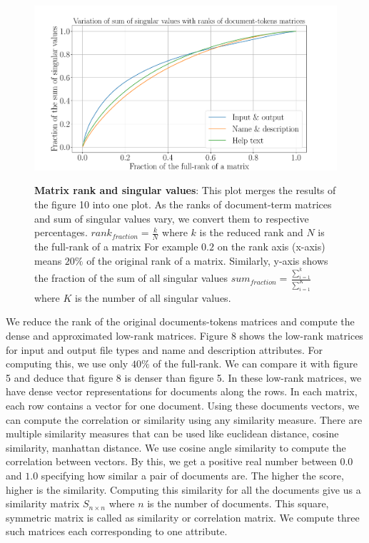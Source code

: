 \begin{figure}[h]
\begin{centering}
    {\includegraphics[scale=0.4]{figures/Fraction_ranks_singular_values.pdf}}
    \caption[Rank singular values]{\textbf{Matrix rank and singular values}: This plot merges the results of the figure 10 into one plot. As the ranks of document-term matrices and sum of singular values vary, we convert them to respective percentages. $rank_{fraction} = \frac{k}{N}$ where $k$ is the reduced rank and $N$ is the full-rank of a matrix For example $0.2$ on the rank axis (x-axis) means $20\%$ of the original rank of a matrix. Similarly, y-axis shows the fraction of the sum of all singular values $ sum_{fraction} = \frac{\sum_{i=1}^k}{\sum_{i=1}^K}$ where $K$ is the number of all singular values.}
\end{centering}
\end{figure}

We reduce the rank of the original documents-tokens matrices and compute the dense and approximated low-rank matrices. Figure 8 shows the low-rank matrices for input and output file types and name and description attributes. For computing this, we use only $40\%$ of the full-rank. We can compare it with figure 5 and deduce that figure 8 is denser than figure 5. In these low-rank matrices, we have dense vector representations for documents along the rows. In each matrix, each row contains a vector for one document. Using these documents vectors, we can compute the correlation or similarity using any similarity measure. There are multiple similarity measures that can be used like euclidean distance, cosine similarity, manhattan distance. We use cosine angle similarity to compute the correlation between vectors. By this, we get a positive real number between $0.0$ and $1.0$ specifying how similar a pair of documents are. The higher the score, higher is the similarity. Computing this similarity for all the documents give us a similarity matrix $S_{n \times n}$ where $n$ is the number of documents. This square, symmetric matrix is called as similarity or correlation matrix. We compute three such matrices each corresponding to one attribute.
  
